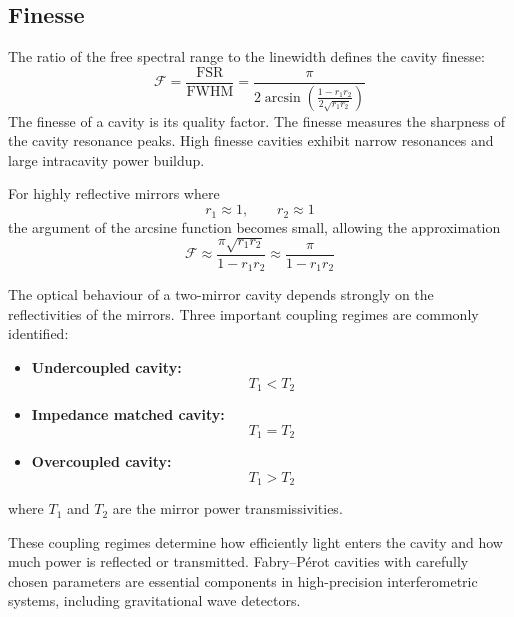 \documentclass{report}
\begin{document}
\subsection{Finesse}
The ratio of the free spectral range to the linewidth defines the cavity finesse:
\begin{equation}
\boxed{\mathcal{F}
=
\frac{\text{FSR}}{\text{FWHM}}
=
\frac{\pi}{
2\arcsin
\left(
\frac{1-r_1 r_2}{2\sqrt{r_1 r_2}}
\right)
}}
\end{equation}
The finesse of a cavity is its quality factor. The finesse measures the sharpness of the cavity resonance peaks. High finesse cavities exhibit narrow resonances and large intracavity power buildup.

For highly reflective mirrors where
\begin{equation}
r_1 \approx 1,
\qquad
r_2 \approx 1
\end{equation}
the argument of the arcsine function becomes small, allowing the approximation
\begin{equation}
\mathcal{F}
\approx
\frac{\pi\sqrt{r_1 r_2}}{1-r_1 r_2}
\approx
\frac{\pi}{1-r_1 r_2}
\end{equation}

The optical behaviour of a two-mirror cavity depends strongly on the reflectivities of the mirrors. Three important coupling regimes are commonly identified:
\begin{itemize}
    \item \textbf{Undercoupled cavity:}
    \begin{equation}
    T_1 < T_2
    \end{equation}
    
    \item \textbf{Impedance matched cavity:}
    \begin{equation}
    T_1 = T_2
    \end{equation}
    
    \item \textbf{Overcoupled cavity:}
    \begin{equation}
    T_1 > T_2
    \end{equation}
\end{itemize}
where $T_1$ and $T_2$ are the mirror power transmissivities.

These coupling regimes determine how efficiently light enters the cavity and how much power is reflected or transmitted. Fabry--P\'erot cavities with carefully chosen parameters are essential components in high-precision interferometric systems, including gravitational wave detectors.
\end{document}
